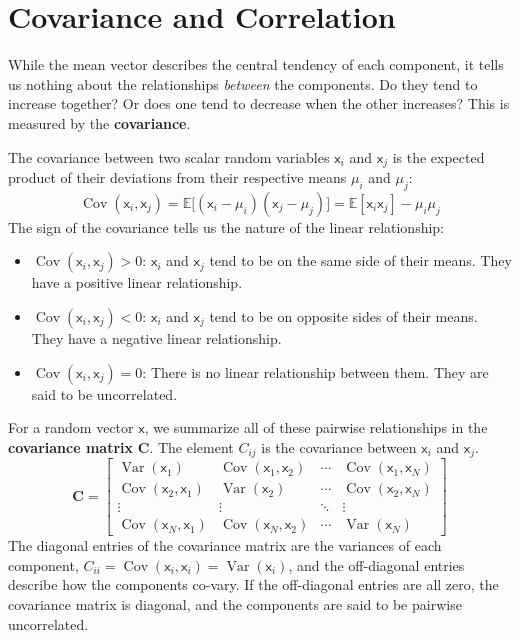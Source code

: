 \section{Covariance and Correlation}
While the mean vector describes the central tendency of each component, it tells us nothing about the relationships \textit{between} the components. Do they tend to increase together? Or does one tend to decrease when the other increases? This is measured by the \textbf{covariance}.

The covariance between two scalar random variables $\mathsf{x}_i$ and $\mathsf{x}_j$ is the expected product of their deviations from their respective means $\mu_i$ and $\mu_j$:
\begin{equation}
    \operatorname{Cov}(\mathsf{x}_i, \mathsf{x}_j) = \mathbb{E}\big[(\mathsf{x}_i - \mu_i)(\mathsf{x}_j - \mu_j)\big] = \mathbb{E}[\mathsf{x}_i \mathsf{x}_j] - \mu_i \mu_j
\end{equation}
The sign of the covariance tells us the nature of the linear relationship:
\begin{itemize}
    \item $\operatorname{Cov}(\mathsf{x}_i, \mathsf{x}_j) > 0$: $\mathsf{x}_i$ and $\mathsf{x}_j$ tend to be on the same side of their means. They have a positive linear relationship.
    \item $\operatorname{Cov}(\mathsf{x}_i, \mathsf{x}_j) < 0$: $\mathsf{x}_i$ and $\mathsf{x}_j$ tend to be on opposite sides of their means. They have a negative linear relationship.
    \item $\operatorname{Cov}(\mathsf{x}_i, \mathsf{x}_j) = 0$: There is no linear relationship between them. They are said to be uncorrelated.
\end{itemize}

For a random vector $\boldsymbol{\mathsf{x}}$, we summarize all of these pairwise relationships in the \textbf{covariance matrix} $\mathbf{C}$. The element $C_{ij}$ is the covariance between $\mathsf{x}_i$ and $\mathsf{x}_j$.
\begin{equation}
    \mathbf{C} = \begin{bmatrix}
        \operatorname{Var}(\mathsf{x}_1) & \operatorname{Cov}(\mathsf{x}_1, \mathsf{x}_2) & \cdots & \operatorname{Cov}(\mathsf{x}_1, \mathsf{x}_N) \\
        \operatorname{Cov}(\mathsf{x}_2, \mathsf{x}_1) & \operatorname{Var}(\mathsf{x}_2) & \cdots & \operatorname{Cov}(\mathsf{x}_2, \mathsf{x}_N) \\
        \vdots & \vdots & \ddots & \vdots \\
        \operatorname{Cov}(\mathsf{x}_N, \mathsf{x}_1) & \operatorname{Cov}(\mathsf{x}_N, \mathsf{x}_2) & \cdots & \operatorname{Var}(\mathsf{x}_N)
    \end{bmatrix}
\end{equation}
The diagonal entries of the covariance matrix are the variances of each component, $C_{ii} = \operatorname{Cov}(\mathsf{x}_i, \mathsf{x}_i) = \operatorname{Var}(\mathsf{x}_i)$, and the off-diagonal entries describe how the components co-vary. If the off-diagonal entries are all zero, the covariance matrix is diagonal, and the components are said to be pairwise uncorrelated.

